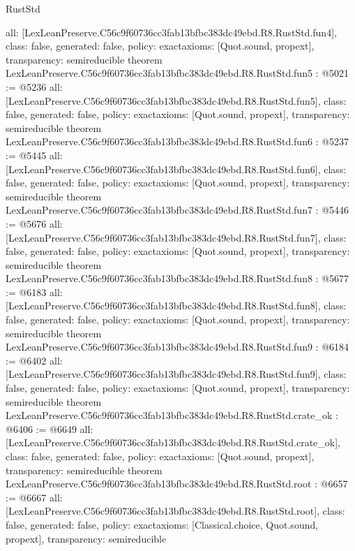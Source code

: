 \begin{lexlean}{RustStd}
\begin{coremodule}
{  all: [LexLeanPreserve.C56c9f60736cc3fab13bfbc383dc49ebd.R8.RustStd.fun4],
  class: false,
  generated: false,
  policy: exact{axioms: [Quot.sound, propext]},
  transparency: semireducible
}
theorem LexLeanPreserve.C56c9f60736cc3fab13bfbc383dc49ebd.R8.RustStd.fun5 : @5021 := @5236 {
  all: [LexLeanPreserve.C56c9f60736cc3fab13bfbc383dc49ebd.R8.RustStd.fun5],
  class: false,
  generated: false,
  policy: exact{axioms: [Quot.sound, propext]},
  transparency: semireducible
}
theorem LexLeanPreserve.C56c9f60736cc3fab13bfbc383dc49ebd.R8.RustStd.fun6 : @5237 := @5445 {
  all: [LexLeanPreserve.C56c9f60736cc3fab13bfbc383dc49ebd.R8.RustStd.fun6],
  class: false,
  generated: false,
  policy: exact{axioms: [Quot.sound, propext]},
  transparency: semireducible
}
theorem LexLeanPreserve.C56c9f60736cc3fab13bfbc383dc49ebd.R8.RustStd.fun7 : @5446 := @5676 {
  all: [LexLeanPreserve.C56c9f60736cc3fab13bfbc383dc49ebd.R8.RustStd.fun7],
  class: false,
  generated: false,
  policy: exact{axioms: [Quot.sound, propext]},
  transparency: semireducible
}
theorem LexLeanPreserve.C56c9f60736cc3fab13bfbc383dc49ebd.R8.RustStd.fun8 : @5677 := @6183 {
  all: [LexLeanPreserve.C56c9f60736cc3fab13bfbc383dc49ebd.R8.RustStd.fun8],
  class: false,
  generated: false,
  policy: exact{axioms: [Quot.sound, propext]},
  transparency: semireducible
}
theorem LexLeanPreserve.C56c9f60736cc3fab13bfbc383dc49ebd.R8.RustStd.fun9 : @6184 := @6402 {
  all: [LexLeanPreserve.C56c9f60736cc3fab13bfbc383dc49ebd.R8.RustStd.fun9],
  class: false,
  generated: false,
  policy: exact{axioms: [Quot.sound, propext]},
  transparency: semireducible
}
theorem LexLeanPreserve.C56c9f60736cc3fab13bfbc383dc49ebd.R8.RustStd.crate_ok : @6406 := @6649 {
  all: [LexLeanPreserve.C56c9f60736cc3fab13bfbc383dc49ebd.R8.RustStd.crate_ok],
  class: false,
  generated: false,
  policy: exact{axioms: [Quot.sound, propext]},
  transparency: semireducible
}
theorem LexLeanPreserve.C56c9f60736cc3fab13bfbc383dc49ebd.R8.RustStd.root : @6657 := @6667 {
  all: [LexLeanPreserve.C56c9f60736cc3fab13bfbc383dc49ebd.R8.RustStd.root],
  class: false,
  generated: false,
  policy: exact{axioms: [Classical.choice, Quot.sound, propext]},
  transparency: semireducible
}


\end{coremodule}
\end{lexlean}
